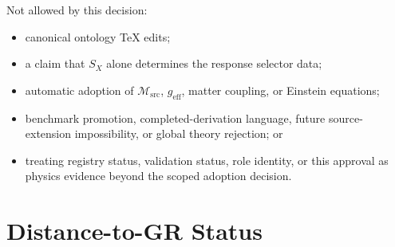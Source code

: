 \documentclass[11pt]{article}
\newcommand{\Msrc}{\mathcal{M}_{\mathrm{src}}}
\newcommand{\geff}{g_{\mathrm{eff}}}
\newcommand{\SX}{S_X}
\begin{document}
Not allowed by this decision:
\begin{itemize}
  \item canonical ontology TeX edits;
  \item a claim that \(\SX\) alone determines the response selector data;
  \item automatic adoption of \(\Msrc\), \(\geff\), matter coupling, or
  Einstein equations;
  \item benchmark promotion, completed-derivation language, future
  source-extension impossibility, or global theory rejection; or
  \item treating registry status, validation status, role identity, or
  this approval as physics evidence beyond the scoped adoption decision.
\end{itemize}

\section{Distance-to-GR Status}
\end{document}
